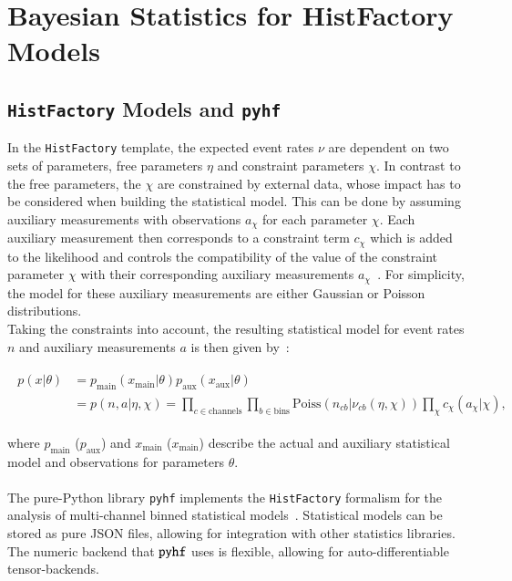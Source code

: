 \section{Bayesian Statistics for HistFactory Models} \label{BayesForpyhf}


\subsection{\texttt{HistFactory} Models and \texttt{pyhf}} \label{subsec:HFandpyhf}

In the \texttt{HistFactory} template, the expected event rates $\nu$ are dependent on two sets of parameters, free parameters $\eta$ and constraint parameters $\chi$. In contrast to the free parameters, the $\chi$ are constrained by external data, whose impact has to be considered when building the statistical model. This can be done by assuming auxiliary measurements with observations $a_{\chi}$ for each parameter $\chi$. Each auxiliary measurement then corresponds to a constraint term  $c_{\chi}$ which is added to the likelihood and controls the compatibility of the value of the constraint parameter $\chi$ with their corresponding auxiliary measurements $a_{\chi}$~\cite{pyhf, pyhf_joss, Cranmer:1456844}. For simplicity, the model for these auxiliary measurements are either Gaussian or Poisson distributions. \\
Taking the constraints into account, the resulting statistical model for event rates $n$ and auxiliary measurements $a$ is then given by~\cite{pyhf, pyhf_joss}:

    \begin{align}
    \begin{split}
        p(x | \theta ) &= p_{\text{main}} (x_{\text{main}}| \theta ) p_{\text{aux}} (x_{\text{aux}}| \theta) \\
         &= p( n, a | \eta, \chi) = \prod_{c \in \text{channels}}  \prod_{b \in \text{bins}} \text{Poiss}(n_{cb} | \nu_{cb}(\eta, \chi)) \prod_{\chi}c_{\chi}(a_{\chi} | \chi),
    \end{split}
    \end{align}

\noindent where $p_{\text{main}}$ ($p_{\text{aux}}$) and $x_{\text{main}}$ ($x_{\text{main}}$) describe the actual and auxiliary statistical model and observations for parameters $\theta$. \\ \\
\noindent The pure-Python library \texttt{pyhf} implements the \texttt{HistFactory} formalism for the analysis of multi-channel binned statistical models~\cite{pyhf, pyhf_joss}. Statistical models can be stored as pure JSON files, allowing for integration with other statistics libraries. The numeric backend that $\texttt{pyhf}$ uses is flexible, allowing for auto-differentiable tensor-backends.

